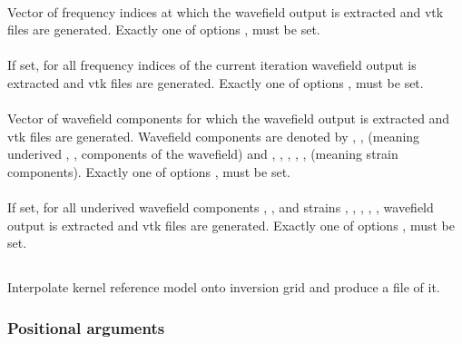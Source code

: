 \paragraph{}
Vector of  frequency indices at which the wavefield output is extracted and 
vtk files are generated. Exactly one of options  ,  must be set.
\paragraph{}
If set, for all frequency indices of the current iteration wavefield output is extracted and 
vtk files are generated. Exactly one of options  ,  must be set.
\paragraph{}
Vector of  wavefield components for which the wavefield output is extracted and 
vtk files are generated. 
Wavefield components are denoted by , ,  (meaning underived , , 
 components of the wavefield) and , , , , ,  
(meaning strain components). 
Exactly one of options ,  must be set.
\paragraph{}
If set, for all underived wavefield components , ,  and
strains , , , , ,  wavefield output is extracted and 
vtk files are generated. 
Exactly one of options ,  must be set.
%
%
\subsection{} \label{programs_scripts,sec:bin_prog,sec:krm_kim}
Interpolate kernel reference model onto inversion grid and produce a  file of it.

\subsubsection{Positional arguments}
